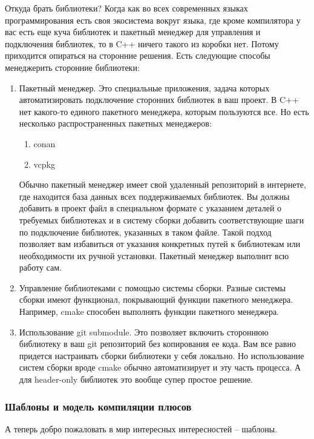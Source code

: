 Откуда брать библиотеки?
Когда как во всех современных языках программирования есть своя экосистема вокруг языка, где кроме компилятора у вас есть еще куча библиотек и пакетный менеджер для управления и подключения библиотек, то в C++ ничего такого из коробки нет.
Потому приходится опираться на сторонние решения.
Есть следующие способы менеджерить сторонние библиотеки:
\begin{enumerate}
\item Пакетный менеджер.
Это специальные приложения, задача которых автоматизировать подключение сторонних библиотек в ваш проект.
В C++ нет какого-то единого пакетного менеджера, которым пользуются все.
Но есть несколько распространенных пакетных менеджеров:
\begin{enumerate}
\item conan

\item vcpkg
\end{enumerate}
Обычно пакетный менеджер имеет свой удаленный репозиторий в интернете, где находится база данных всех поддерживаемых библиотек.
Вы должны добавить в проект файл в специальном формате с указанием деталей о требуемых библиотеках и в систему сборки добавить соответствующие шаги по подключение библиотек, указанных в таком файле.
Такой подход позволяет вам избавиться от указания конкретных путей к библиотекам или необходимости их ручной установки.
Пакетный менеджер выполнит всю работу сам.

\item Управление библиотеками с помощью системы сборки.
Разные системы сборки имеют функционал, покрывающий функции пакетного менеджера.
Например, cmake способен выполнять функции пакетного менеджера.

\item Использование git submodule.
Это позволяет включить стороннюю библиотеку в ваш git репозиторий без копирования ее кода.
Вам все равно придется настраивать сборки библиотеки у себя локально.
Но использование систем сборки вроде cmake обычно автоматизирует и эту часть процесса.
А для header-only библиотек это вообще супер простое решение.
\end{enumerate}


\subsubsection{Шаблоны и модель компиляции плюсов}

А теперь добро пожаловать в мир интересных интересностей -- шаблоны.


